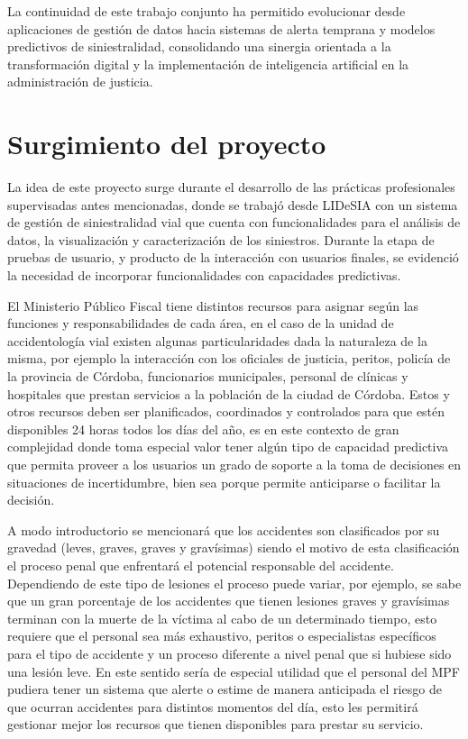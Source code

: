 La continuidad de este trabajo conjunto ha permitido evolucionar desde aplicaciones de gestión de datos hacia sistemas de alerta temprana y modelos predictivos de siniestralidad, consolidando una sinergia orientada a la transformación digital y la implementación de inteligencia artificial en la administración de justicia.

\section{Surgimiento del proyecto}\label{surgimiento-del-proyecto}

La idea de este proyecto surge durante el desarrollo de las prácticas profesionales supervisadas antes mencionadas, donde se trabajó desde LIDeSIA con un sistema de gestión de siniestralidad vial que cuenta con funcionalidades para el análisis de datos, la visualización y caracterización de los siniestros. Durante la etapa de pruebas de usuario, y producto de la interacción con usuarios finales, se evidenció la necesidad de incorporar funcionalidades con capacidades predictivas.

El Ministerio Público Fiscal tiene distintos recursos para asignar según las funciones y responsabilidades de cada área, en el caso de la unidad de accidentología vial existen algunas particularidades dada la naturaleza de la misma, por ejemplo la interacción con los oficiales de justicia, peritos, policía de la provincia de Córdoba, funcionarios municipales, personal de clínicas y hospitales que prestan servicios a la población de la ciudad de Córdoba. Estos y otros recursos deben ser planificados, coordinados y controlados para que estén disponibles 24 horas todos los días del año, es en este contexto de gran complejidad donde toma especial valor tener algún tipo de capacidad predictiva que permita proveer a los usuarios un grado de soporte a la toma de decisiones en situaciones de incertidumbre, bien sea porque permite anticiparse o facilitar la decisión.

A modo introductorio se mencionará que los accidentes son clasificados por su gravedad (leves, graves, graves y gravísimas) siendo el motivo de esta clasificación el proceso penal que enfrentará el potencial responsable del accidente. Dependiendo de este tipo de lesiones el proceso puede variar, por ejemplo, se sabe que un gran porcentaje de los accidentes que tienen lesiones graves y gravísimas terminan con la muerte de la víctima al cabo de un determinado tiempo, esto requiere que el personal sea más exhaustivo, peritos o especialistas específicos para el tipo de accidente y un proceso diferente a nivel penal que si hubiese sido una lesión leve. En este sentido sería de especial utilidad que el personal del MPF pudiera tener un sistema que alerte o estime de manera anticipada el riesgo de que ocurran accidentes para distintos momentos del día, esto les permitirá gestionar mejor los recursos que tienen disponibles para prestar su servicio.


